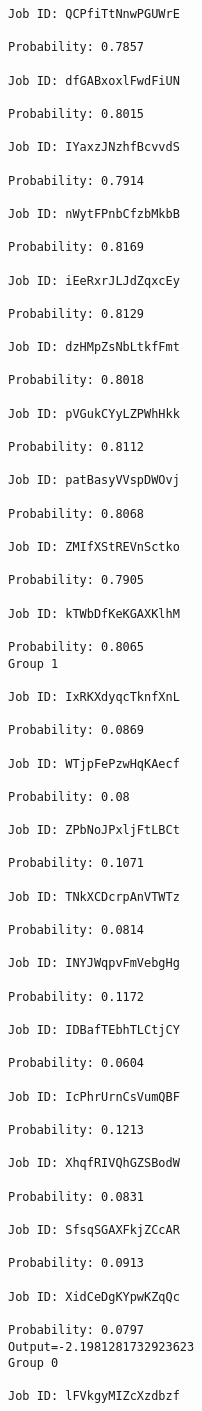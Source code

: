 \documentclass[11pt]{article}
\begin{document}
\begin{Verbatim}[commandchars=\\\{\}]
Job ID: QCPfiTtNnwPGUWrE

Probability: 0.7857

Job ID: dfGABxoxlFwdFiUN

Probability: 0.8015

Job ID: IYaxzJNzhfBcvvdS

Probability: 0.7914

Job ID: nWytFPnbCfzbMkbB

Probability: 0.8169

Job ID: iEeRxrJLJdZqxcEy

Probability: 0.8129

Job ID: dzHMpZsNbLtkfFmt

Probability: 0.8018

Job ID: pVGukCYyLZPWhHkk

Probability: 0.8112

Job ID: patBasyVVspDWOvj

Probability: 0.8068

Job ID: ZMIfXStREVnSctko

Probability: 0.7905

Job ID: kTWbDfKeKGAXKlhM

Probability: 0.8065
Group 1

Job ID: IxRKXdyqcTknfXnL

Probability: 0.0869

Job ID: WTjpFePzwHqKAecf

Probability: 0.08

Job ID: ZPbNoJPxljFtLBCt

Probability: 0.1071

Job ID: TNkXCDcrpAnVTWTz

Probability: 0.0814

Job ID: INYJWqpvFmVebgHg

Probability: 0.1172

Job ID: IDBafTEbhTLCtjCY

Probability: 0.0604

Job ID: IcPhrUrnCsVumQBF

Probability: 0.1213

Job ID: XhqfRIVQhGZSBodW

Probability: 0.0831

Job ID: SfsqSGAXFkjZCcAR

Probability: 0.0913

Job ID: XidCeDgKYpwKZqQc

Probability: 0.0797
Output=-2.1981281732923623
Group 0

Job ID: lFVkgyMIZcXzdbzf


\end{Verbatim}
\end{document}
